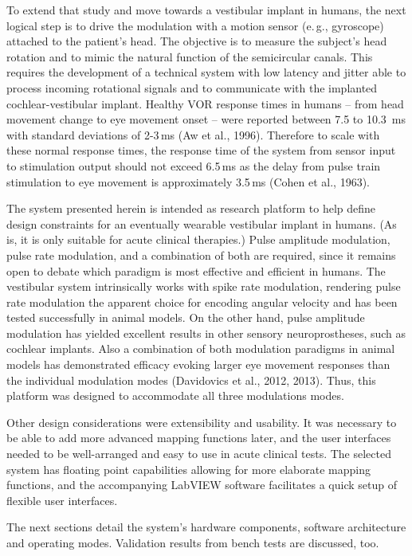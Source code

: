 To extend that study and move towards a vestibular implant in humans, the next logical step is to drive the modulation with a motion sensor (e.\,g., gyroscope) attached to the patient’s head. The objective is to measure the subject’s head rotation and to mimic the natural function of the semicircular canals. This requires the development of a technical system with low latency and jitter able to process incoming rotational signals and to communicate with the implanted cochlear-vestibular implant. Healthy VOR response times in humans -- from head movement change to eye movement onset -- were reported between 7.5 to \SI{10.3}{\milli\second} with standard deviations of 2-3\,ms (Aw et al., 1996). Therefore to scale with these normal response times, the response time of the system from sensor input to stimulation output should not exceed 6.5\,ms as the delay from pulse train stimulation to eye movement is approximately 3.5\,ms (Cohen et al., 1963).

The system presented herein is intended as research platform to help define design constraints for an eventually wearable vestibular implant in humans. (As is, it is only suitable for acute clinical therapies.) Pulse amplitude modulation, pulse rate modulation, and a combination of both are required, since it remains open to debate which paradigm is most effective and efficient in humans. The vestibular system intrinsically works with spike rate modulation, rendering pulse rate modulation the apparent choice for encoding angular velocity and has been tested successfully in animal models. On the other hand, pulse amplitude modulation has yielded excellent results in other sensory neuroprostheses, such as cochlear implants. Also a combination of both modulation paradigms in animal models has demonstrated efficacy evoking larger eye movement responses than the individual modulation modes (Davidovics et al., 2012, 2013). Thus, this platform was designed to accommodate all three modulations modes.

Other design considerations were extensibility and usability. It was necessary to be able to add more advanced mapping functions later, and the user interfaces needed to be well-arranged and easy to use in acute clinical tests. The selected system has floating point capabilities allowing for more elaborate mapping functions, and the accompanying LabVIEW software facilitates a quick setup of flexible user interfaces.

The next sections detail the system's hardware components, software architecture and operating modes. Validation results from bench tests are discussed, too.

